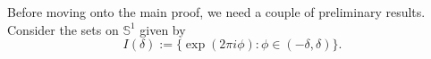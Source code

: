 \documentclass[11pt]{amsart}
\theoremstyle{definition}
\newtheorem*{remark}{Remark}
\DeclareMathOperator*{\E}{\mathbb{E}}
\newcommand{\C}{{\mathbb C}}
\newcommand{\NN}{{\mathcal N}}
\renewcommand{\S}{\mathbb{S}}
\newcommand{\WS}[1]{{\color{blue}{{#1}}}}
\begin{document}
Before moving onto the main proof, we need a couple of preliminary results. Consider the sets on $\S^1$ given by
\[
I(\delta):=\{\exp(2\pi i\phi) : \phi \in (-\delta,\delta)\}.
\]
\end{document}
